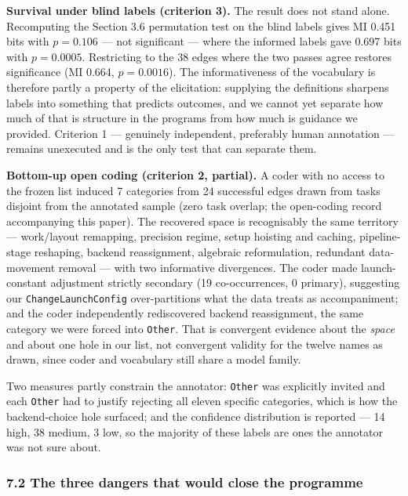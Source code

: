 \documentclass[
  11pt,
]{article}
\begin{document}
\textbf{Survival under blind labels (criterion 3).} The result does not stand alone. Recomputing the Section 3.6 permutation test on the blind labels gives MI 0.451 bits with \(p = 0.106\) --- not significant --- where the informed labels gave 0.697 bits with \(p = 0.0005\). Restricting to the 38 edges where the two passes agree restores significance (MI 0.664, \(p = 0.0016\)). The informativeness of the vocabulary is therefore partly a property of the elicitation: supplying the definitions sharpens labels into something that predicts outcomes, and we cannot yet separate how much of that is structure in the programs from how much is guidance we provided. Criterion 1 --- genuinely independent, preferably human annotation --- remains unexecuted and is the only test that can separate them.

\textbf{Bottom-up open coding (criterion 2, partial).} A coder with no access to the frozen list induced 7 categories from 24 successful edges drawn from tasks disjoint from the annotated sample (zero task overlap; the open-coding record accompanying this paper). The recovered space is recognisably the same territory --- work/layout remapping, precision regime, setup hoisting and caching, pipeline-stage reshaping, backend reassignment, algebraic reformulation, redundant data-movement removal --- with two informative divergences. The coder made launch-constant adjustment strictly secondary (19 co-occurrences, 0 primary), suggesting our \texttt{ChangeLaunchConfig} over-partitions what the data treats as accompaniment; and the coder independently rediscovered backend reassignment, the same category we were forced into \texttt{Other}. That is convergent evidence about the \emph{space} and about one hole in our list, not convergent validity for the twelve names as drawn, since coder and vocabulary still share a model family.

Two measures partly constrain the annotator: \texttt{Other} was explicitly invited and each \texttt{Other} had to justify rejecting all eleven specific categories, which is how the backend-choice hole surfaced; and the confidence distribution is reported --- 14 high, 38 medium, 3 low, so the majority of these labels are ones the annotator was not sure about.

\hypertarget{the-three-dangers-that-would-close-the-programme}{%
\subsubsection{7.2 The three dangers that would close the programme}\label{the-three-dangers-that-would-close-the-programme}}
\end{document}
